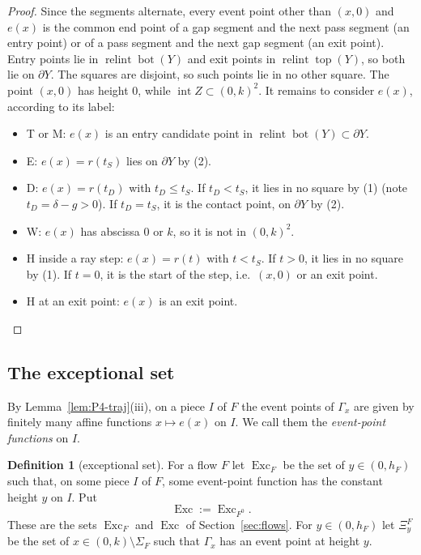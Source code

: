 \documentclass[11pt]{amsart}
\newcommand{\relint}{\operatorname{relint}}
\newcommand{\Bot}{\operatorname{bot}}
\newcommand{\Top}{\operatorname{top}}
\newcommand{\Exc}{\operatorname{Exc}}
\newcommand{\Fz}{F^{0}}
\theoremstyle{definition}
\newtheorem{definition}[theorem]{Definition}
\theoremstyle{remark}
\numberwithin{equation}{section}
\begin{document}
\begin{proof}
Since the segments alternate, every event point other than $(x,0)$ and $e(x)$ is the common end point of a gap segment and the next pass segment (an entry point) or of a pass segment and the next gap segment (an exit point). Entry points lie in $\relint\Bot(Y)$ and exit points in $\relint\Top(Y)$, so both lie on $\partial Y$. The squares are disjoint, so such points lie in no other square. The point $(x,0)$ has height $0$, while $\operatorname{int}Z\subset(0,k)^2$. It remains to consider $e(x)$, according to its label:
\begin{itemize}
\item T or M: $e(x)$ is an entry candidate point in $\relint\Bot(Y)\subset\partial Y$.
\item E: $e(x)=r(t_S)$ lies on $\partial Y$ by (2).
\item D: $e(x)=r(t_D)$ with $t_D\le t_S$. If $t_D<t_S$, it lies in no square by (1) (note $t_D=\delta-g>0$). If $t_D=t_S$, it is the contact point, on $\partial Y$ by (2).
\item W: $e(x)$ has abscissa $0$ or $k$, so it is not in $(0,k)^2$.
\item H inside a ray step: $e(x)=r(t)$ with $t<t_S$. If $t>0$, it lies in no square by (1). If $t=0$, it is the start of the step, i.e.\ $(x,0)$ or an exit point.
\item H at an exit point: $e(x)$ is an exit point. \qedhere
\end{itemize}
\end{proof}

\subsection{The exceptional set}\label{ssec:P4-exc}

By Lemma~\ref{lem:P4-traj}(iii), on a piece $I$ of $F$ the event points of $\Gamma_x$ are given by finitely many affine functions $x\mapsto e(x)$ on $I$. We call them the \emph{event-point functions} on $I$.

\begin{definition}[exceptional set]\label{def:P4-exc}
For a flow $F$ let $\Exc_F$ be the set of $y\in(0,h_F)$ such that, on some piece $I$ of $F$, some event-point function has the constant height $y$ on $I$. Put
\[
\Exc:=\Exc_{\Fz}.
\]
These are the sets $\Exc_F$ and $\Exc$ of Section~\ref{sec:flows}.
For $y\in(0,h_F)$ let $\Xi^F_y$ be the set of $x\in(0,k)\setminus\Sigma_F$ such that $\Gamma_x$ has an event point at height $y$.
\end{definition}
\end{document}
